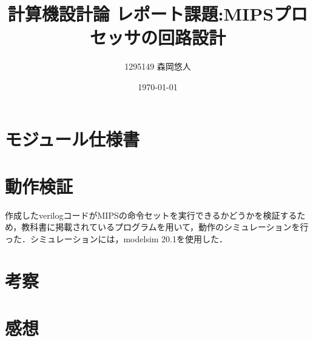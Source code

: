 \documentclass[dvipdfmx]{jsarticle}
\title{計算機設計論 レポート課題:MIPSプロセッサの回路設計}
\author{1295149 森岡悠人\\}
\date{\today}
\begin{document}
\maketitle

\section{モジュール仕様書}
\section{動作検証}
作成したverilogコードがMIPSの命令セットを実行できるかどうかを検証するため，教科書\cite{textbook}に掲載されているプログラムを用いて，動作のシミュレーションを行った．シミュレーションには，modelsim 20.1を使用した．
\section{考察}
\section{感想}



\end{document}
